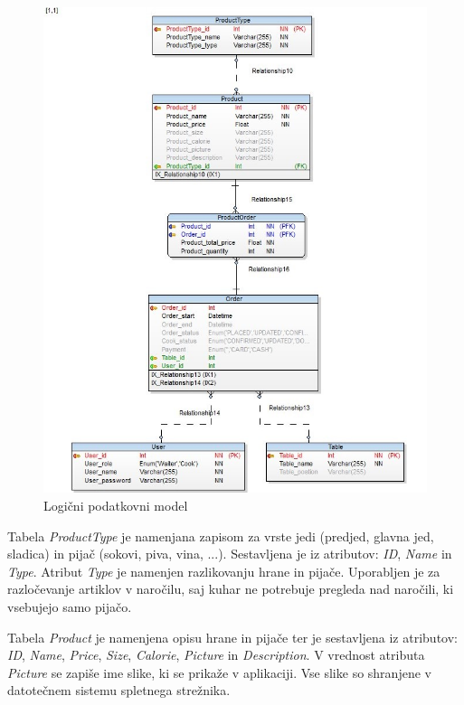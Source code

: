 \documentclass[a4paper, 12pt]{book}
\begin{document}
\begin{figure}[!htb]
\begin{center}
\includegraphics[width=12.5cm]{Database_physical}
\caption{Logični podatkovni model}
\label{Database_physical}
\end{center}
\end{figure}

Tabela \textit{ProductType} je namenjana zapisom za vrste jedi (predjed, glavna jed, sladica) in pijač (sokovi, piva, vina, ...). Sestavljena je iz atributov: \textit{ID}, \textit{Name} in \textit{Type}. Atribut \textit{Type} je namenjen razlikovanju hrane in pijače. Uporabljen je za razločevanje artiklov v naročilu, saj kuhar ne potrebuje pregleda nad naročili, ki vsebujejo samo pijačo. 

Tabela \textit{Product} je namenjena opisu hrane in pijače ter je sestavljena iz atributov: \textit{ID}, \textit{Name}, \textit{Price}, \textit{Size}, \textit{Calorie}, \textit{Picture} in \textit{Description}. V vrednost atributa \textit{Picture} se zapiše ime slike, ki se prikaže v aplikaciji. Vse slike so shranjene v datotečnem sistemu spletnega strežnika.
\end{document}
